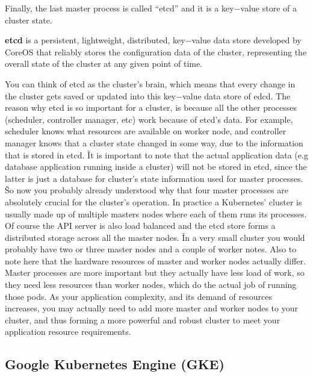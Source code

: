 Finally, the last master process is called ``etcd'' and it is a key$-$value store of a cluster state.

\bd[etcd]
\textbf{etcd} is a persistent, lightweight, distributed, key$-$value data store developed by CoreOS that reliably
stores the configuration data of the cluster, representing the overall state of the cluster at any given point of
time.
\ed


You can think of etcd as the cluster's brain, which means that every change in the cluster gets saved or updated into
this key$-$value data store of edcd. The reason why etcd is so important for a cluster, is because all the other
processes (scheduler, controller manager, etc) work because of etcd's data. For example, scheduler knows what
resources are available on worker node, and controller manager knows that a cluster state changed in some way, due to
the information that is stored in etcd. \v

It is important to note that the actual application data (e.g database application running inside a cluster) will not
be stored in etcd, since the latter is just a database for cluster's state information used for master processes. \v

So now you probably already understood why that four master processes are absolutely crucial for the cluster's
operation. In practice a Kubernetes' cluster is usually made up of multiple masters nodes where each of them runs its
processes. Of course the API server is also load balanced and the etcd store forms a distributed storage across all
the master nodes. \v

In a very small cluster you would probably have two or three master nodes and a couple of worker notes. Also to note
here that the hardware resources of master and worker nodes actually differ. Master processes are more important but
they actually have less load of work, so they need less resources than worker nodes, which do the actual job of
running those pods. As your application complexity, and its demand of resources increases, you may actually need to
add more master and worker nodes to your cluster, and thus forming a more powerful and robust cluster to meet your
application resource requirements.


\subsection{Google Kubernetes Engine (GKE)}

